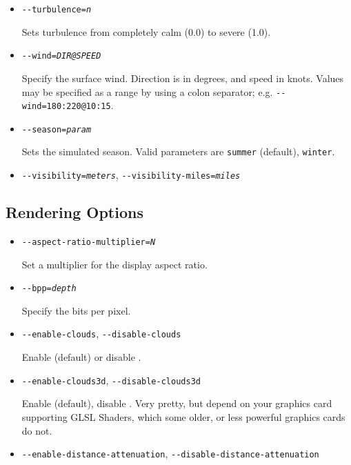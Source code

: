 {\begin{itemize}
\item{\texttt{-$ $-turbulence={\it n}}}

Sets turbulence from completely calm (0.0) to severe (1.0).


\item{\texttt{-$ $-wind={\it DIR@SPEED}}}

Specify the surface wind. Direction is in degrees, and speed in knots. Values may be specified as a range
by using a colon separator; e.g. \texttt{-$ $-wind=180:220@10:15}.

\item{\texttt{-$ $-season={\it param}}}

Sets the simulated season. Valid parameters are \texttt{summer} (default), \texttt{winter}.

\item{\texttt{-$ $-visibility={\it meters}}, \texttt{-$ $-visibility-miles={\it miles}}}

\end{itemize}

\subsection{Rendering Options}
\begin{itemize}

\item{\texttt{-$ $-aspect-ratio-multiplier={\it N}}}

Set a multiplier for the display aspect ratio.

\item{\texttt{-$ $-bpp={\it depth}}}

Specify the bits per pixel.


\item{\texttt{-$ $-enable-clouds}, \texttt{-$ $-disable-clouds}}

Enable (default) or disable .

\item{\texttt{-$ $-enable-clouds3d}, \texttt{-$ $-disable-clouds3d}}

Enable (default), disable . Very pretty, but depend on your graphics card supporting
GLSL Shaders, which some older, or less powerful graphics cards do not.

\item{\texttt{-$ $-enable-distance-attenuation}, \texttt{-$ $-disable-distance-attenuation}}


\end{itemize}}
